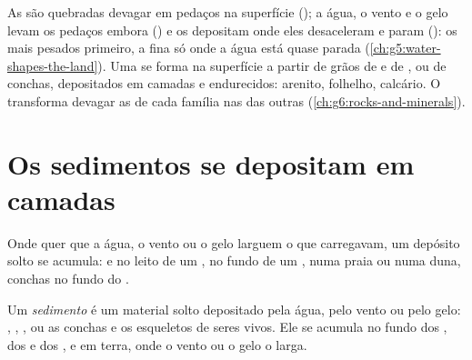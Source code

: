 \begin{recall}
As  são quebradas devagar em pedaços na superfície
(\emph{}); a água, o vento e o gelo levam os pedaços embora
(\emph{}) e os depositam onde eles desaceleram e param
(\emph{}): os mais pesados primeiro, a  fina só onde a água
está quase parada (\cref{ch:g5:water-shapes-the-land}). Uma \emph{} se forma na superfície a partir de grãos de  e de ,
ou de conchas, depositados em camadas e endurecidos: arenito, folhelho,
calcário. O  transforma devagar as  de cada família
nas das outras (\cref{ch:g6:rocks-and-minerals}).
\end{recall}

\section{Os sedimentos se depositam em camadas}

Onde quer que a água, o vento ou o gelo larguem o que carregavam, um
depósito solto se acumula:  e  no leito de um ,  no
fundo de um ,  numa praia ou numa duna, conchas no fundo do .

\begin{definition}[Sedimento]\label{def:g7:sediments-and-fossils:sediment}
Um \emph{sedimento} é um material solto depositado pela
água, pelo vento ou pelo gelo: , , , ou as conchas e os
esqueletos de seres vivos. Ele se acumula no fundo dos , dos  e
dos , e em terra, onde o vento ou o gelo o larga.
\end{definition}

